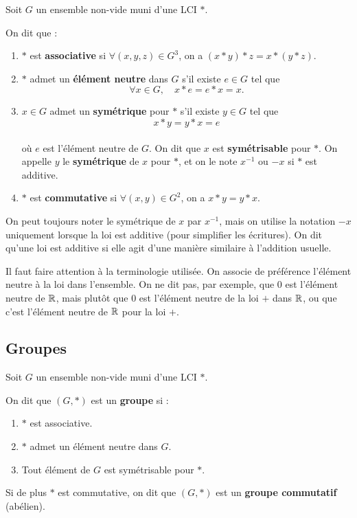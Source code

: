 \documentclass[12pt, a4paper]{report}
\begin{document}
\begin{definition}[]
    Soit $G$ un ensemble non-vide muni d'une LCI $*$.

    On dit que :
    \begin{enumerate}
        \item $*$ est \textbf{associative} si $\forall (x,y,z)\in G^3$, on a $(x*y)*z=x*(y*z)$.
        \item $*$ admet un \textbf{élément neutre} dans $G$ s'il existe $e\in G$ tel que\\
        $$\forall x\in G, \quad x*e=e*x=x.$$
        \item $x\in G$ admet un \textbf{symétrique} pour $*$ s'il existe $y\in G$ tel que\\
        $$x*y=y*x=e$$
        \\où $e$ est l'élément neutre de $G$. On dit que $x$ est \textbf{symétrisable} pour $*$. On appelle $y$ le \textbf{symétrique} de $x$ pour $*$, et on le note $x^{-1}$ ou $-x$ si $*$ est additive.
        \item $*$ est \textbf{commutative} si $\forall (x,y)\in G^2$, on a $x*y=y*x$.
    \end{enumerate}
\end{definition}

\begin{remark}
    On peut toujours noter le symétrique de $x$ par $x^{-1}$, mais on utilise la notation $-x$ uniquement lorsque la loi est additive (pour simplifier les écritures). On dit qu'une loi est additive si elle agit d'une manière similaire à l'addition usuelle.
\end{remark}

\begin{attention}
    Il faut faire attention à la terminologie utilisée. On associe de préférence l'élément neutre à la loi dans l'ensemble. On ne dit pas, par exemple, que $0$ est l'élément neutre de $\mathbb{R}$, mais plutôt que $0$ est l'élément neutre de la loi $+$ dans $\mathbb{R}$, ou que c'est l'élément neutre de $\mathbb{R}$ pour la loi $+$.
\end{attention}

\subsection{Groupes}

\begin{definition}[Groupe]
    Soit $G$ un ensemble non-vide muni d'une LCI $*$.

    On dit que $(G,*)$ est un \textbf{groupe} si :
    \begin{enumerate}
        \item $*$ est associative.
        \item $*$ admet un élément neutre dans $G$.
        \item Tout élément de $G$ est symétrisable pour $*$.
    \end{enumerate}

    Si de plus $*$ est commutative, on dit que $(G,*)$ est un \textbf{groupe commutatif} (abélien).
\end{definition}
\end{document}
